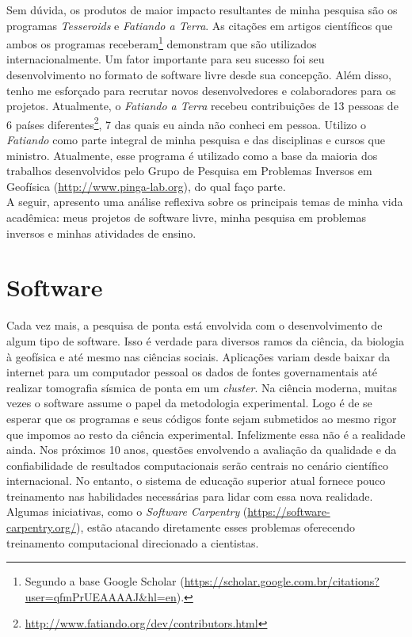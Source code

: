 \documentclass[12pt,a4paper,oneside,titlepage,onecolumn]{article}
\begin{document}
Sem dúvida, os produtos de maior impacto resultantes de minha pesquisa são os
programas {\em Tesseroids} e {\em Fatiando a Terra}.
As citações em artigos científicos que ambos os programas
receberam\footnote{Segundo a base Google Scholar
(\url{https://scholar.google.com.br/citations?user=qfmPrUEAAAAJ&hl=en}).}
demonstram que são utilizados internacionalmente.
Um fator importante para seu sucesso foi seu desenvolvimento no formato de
software livre desde sua concepção.
Além disso, tenho me esforçado para recrutar novos desenvolvedores e
colaboradores para os projetos.
Atualmente, o {\em Fatiando a Terra} recebeu contribuições de 13 pessoas de 6
países
diferentes\footnote{\url{http://www.fatiando.org/dev/contributors.html}},
7 das quais eu ainda não conheci em pessoa.
Utilizo o {\em Fatiando} como parte integral de minha pesquisa e das
disciplinas e cursos que ministro.
Atualmente, esse programa é utilizado como a base da maioria dos trabalhos
desenvolvidos pelo Grupo de Pesquisa em Problemas Inversos em Geofísica
(\url{http://www.pinga-lab.org}), do qual faço parte.
\\[0.5cm]

A seguir, apresento uma análise reflexiva sobre os principais temas de minha
vida acadêmica: meus projetos de software livre, minha pesquisa em problemas
inversos e minhas atividades de ensino.

\section{Software}
\label{software}

Cada vez mais, a pesquisa de ponta está envolvida com o desenvolvimento de
algum tipo de software.
Isso é verdade para diversos ramos da ciência, da biologia à geofísica e até
mesmo nas ciências sociais.
Aplicações variam desde baixar da internet para um computador pessoal os dados
de fontes governamentais até realizar tomografia sísmica de ponta em um
\textit{cluster}.
Na ciência moderna, muitas vezes o software assume o papel da metodologia
experimental.
Logo é de se esperar que os programas e seus códigos fonte sejam submetidos
ao mesmo rigor que impomos ao resto da ciência experimental.
Infelizmente essa não é a realidade ainda.
Nos próximos 10 anos, questões envolvendo a avaliação da qualidade e da
confiabilidade de resultados computacionais serão centrais no cenário
científico internacional.
No entanto, o sistema de educação superior atual fornece pouco treinamento nas
habilidades necessárias para lidar com essa nova realidade.
Algumas iniciativas, como o \textit{Software Carpentry}
(\url{https://software-carpentry.org/}), estão atacando diretamente esses
problemas oferecendo treinamento computacional direcionado a cientistas.
\end{document}
